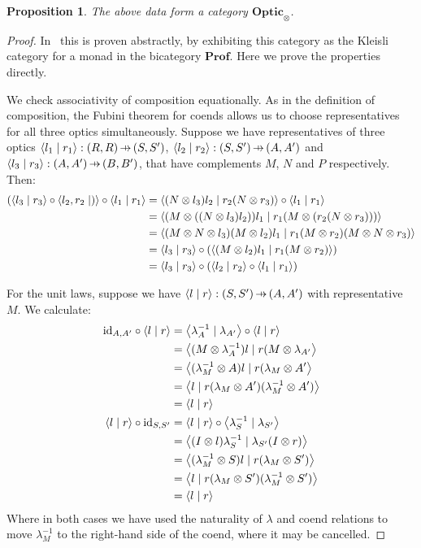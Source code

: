\documentclass[11pt,a4paper]{article}
\theoremstyle{plain}
\newtheorem{proposition}[theorem]{Proposition}
\theoremstyle{definition}
\newcommand{\Prof}{\mathbf{Prof}}
\newcommand{\Optic}{\mathbf{Optic}}
\newcommand{\id}{\mathrm{id}}
\newcommand{\rep}[2]{{\ensuremath \left\langle #1 \mid #2 \right\rangle}}
\newcommand{\hto}{\ensuremath{\,\mathaccent\shortmid\rightarrow\,}}
\begin{document}
\begin{proposition}\label{prop-optic-is-cat}
  The above data form a category $\Optic_\otimes$.
\end{proposition}
\begin{proof}
  In~\cite[Section 6]{Doubles} this is proven abstractly, by exhibiting this category as the Kleisli category for a monad in the bicategory $\Prof$. Here we prove the properties directly.

  We check associativity of composition equationally. As in the definition of composition, the Fubini theorem for coends allows us to choose representatives for all three optics simultaneously. Suppose we have representatives of three optics $\rep{l_1}{r_1} : (R, R) \hto (S, S')$, $\rep{l_2}{r_2} : (S, S') \hto (A, A')$ and $\rep{l_3}{r_3} : (A, A') \hto (B, B')$, that have complements $M$, $N$ and $P$ respectively. Then:
  \begin{align*}
    (\rep{l_3}{r_3} \circ \rep{l_2, r_2}) \circ \rep{l_1}{r_1}
    &= \rep{(N \otimes l_3)l_2}{r_2(N \otimes r_3)} \circ \rep{l_1}{r_1} \\
    &= \rep{(M \otimes ((N \otimes l_3)l_2))l_1}{r_1(M \otimes (r_2(N \otimes r_3)))} \\
    &= \rep{(M \otimes N \otimes l_3)(M \otimes l_2)l_1}{r_1(M \otimes r_2)(M \otimes N \otimes r_3)} \\
    &= \rep{l_3}{r_3} \circ (\rep{(M \otimes l_2)l_1}{r_1(M \otimes r_2)}) \\
    &= \rep{l_3}{r_3} \circ (\rep{l_2}{r_2} \circ \rep{l_1}{r_1})
  \end{align*}

  For the unit laws, suppose we have $\rep{l}{r} : (S, S') \hto (A, A')$ with representative $M$. We calculate:
  \begin{align*}
    \id_{A, A'} \circ \rep{l}{r}
    &= \rep{\lambda^{-1}_A}{\lambda_{A'}} \circ \rep{l}{r} \\
    &= \rep{(M \otimes \lambda^{-1}_A) l}{r (M\otimes  \lambda_{A'}} \\
    &= \rep{(\lambda^{-1}_M \otimes  A) l}{r (\lambda_M \otimes A'} \\
    &= \rep{l}{r (\lambda_M \otimes A') (\lambda^{-1}_M \otimes A')} \\
    &= \rep{l}{r} \\
    \rep{l}{r} \circ \id_{S, S'}
    &= \rep{l}{r} \circ \rep{\lambda^{-1}_S}{\lambda_{S'}}  \\
    &= \rep{(I \otimes l)\lambda^{-1}_S}{\lambda_{S'} (I \otimes r)} \\
    &= \rep{(\lambda^{-1}_M \otimes S)l}{r (\lambda_{M} \otimes S')} \\
    &= \rep{l}{r (\lambda_{M} \otimes S')(\lambda^{-1}_M \otimes S')} \\
    &= \rep{l}{r}
  \end{align*}
  Where in both cases we have used the naturality of $\lambda$ and coend relations to move $\lambda^{-1}_M$ to the right-hand side of the coend, where it may be cancelled.
\end{proof}
\end{document}
